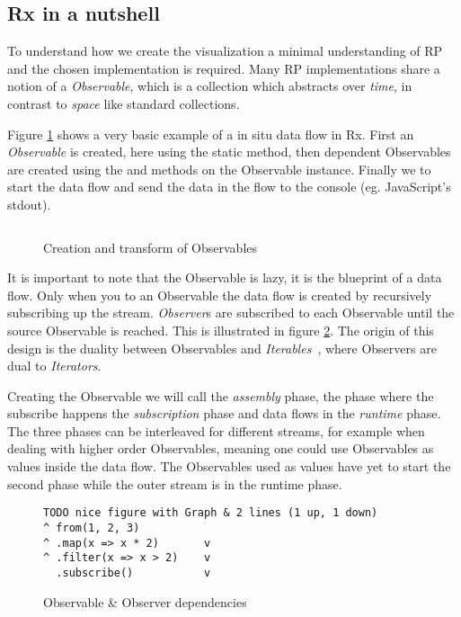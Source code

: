 \subsection{Rx in a nutshell}
To understand how we create the visualization a minimal understanding of RP and the chosen implementation is required. Many RP implementations share a notion of a \textit{Observable}, which is a collection which abstracts over \textit{time}, in contrast to \textit{space} like standard collections.

Figure \ref{sample1} shows a very basic example of a in situ data flow in Rx. First an \textit{Observable} is created, here using the static  method, then dependent Observables are created using the  and  methods on the Observable instance. Finally we  to start the data flow and send the data in the flow to the console (eg. JavaScript's stdout).

\begin{figure}
\inputminted[tabsize=2]{javascript}{listings/sample1.js}	
\caption{Creation and transform of Observables}
\label{sample1}
\end{figure}

It is important to note that the Observable is lazy, it is the blueprint of a data flow. Only when you  to an Observable the data flow is created by recursively subscribing up the stream. \textit{Observer}s are subscribed to each Observable until the source Observable is reached.
This is illustrated in figure \ref{dualgraphs}.
The origin of this design is the duality between Observables and \textit{Iterables}~\cite{meijer2010subject}, where Observers are dual to \textit{Iterators}.

Creating the Observable we will call the \textit{assembly} phase, the phase where the subscribe happens the \textit{subscription} phase and data flows in the \textit{runtime} phase. The three phases can be interleaved for different streams, for example when dealing with higher order Observables,  meaning one could use Observables as values inside the data flow. The Observables used as values have yet to start the second phase while the outer stream is in the runtime phase.

\begin{figure}
\begin{verbatim}
TODO nice figure with Graph & 2 lines (1 up, 1 down)
^ from(1, 2, 3)   			
^ .map(x => x * 2)       v
^ .filter(x => x > 2)    v
  .subscribe()           v
\end{verbatim}
\caption{Observable \& Observer dependencies}
\label{dualgraphs}
\end{figure}
